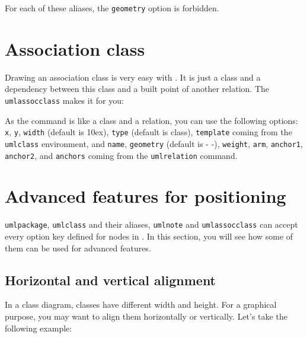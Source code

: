 \documentclass[a4paper,11pt]{report}
\begin{document}
\begin{remark}
	For each of these aliases, the {\tt geometry} option is forbidden.
\end{remark}

\section{Association class}

Drawing an association class is very easy with \tuml. It is just a class and a dependency between this class and a built point of another relation. The {\tt umlassocclass} makes it for you:

\medskip

\begin{minipage}{0.4\textwidth}
	
\end{minipage}
\begin{minipage}{0.6\textwidth}
	\begin{center}
	\end{center}
\end{minipage}

\medskip

As the command is like a class and a relation, you can use the following options: {\tt x}, {\tt y}, {\tt width} (default is 10ex), {\tt type} (default is class), {\tt template} coming from the {\tt umlclass} environment, and {\tt name}, {\tt geometry} (default is - -), {\tt weight}, {\tt arm}, {\tt anchor1}, {\tt anchor2}, and {\tt anchors} coming from the {\tt umlrelation} command.

\section{Advanced features for positioning}\label{s.advfeat}

{\tt umlpackage}, {\tt umlclass} and their aliases, {\tt umlnote} and {\tt umlassocclass} can accept every option key defined for nodes in \TikZ.
In this section, you will see how some of them can be used for advanced features.

\subsection{Horizontal and vertical alignment}\label{ss.hvalign}

In a class diagram, classes have different width and height. For a graphical purpose, you may want to align them horizontally or vertically. Let's take the following example:
\end{document}
